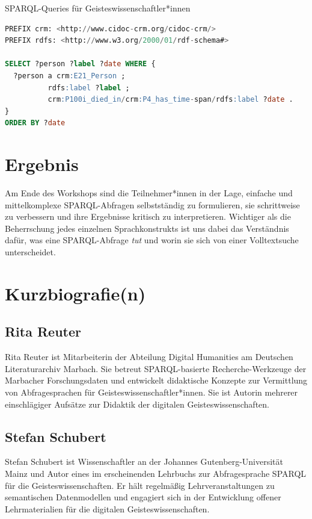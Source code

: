 \begin{beitrag}{SPARQL-Queries für Geisteswissenschaftler*innen}
\begin{lstlisting}[language=SQL, caption={Eine erste SPARQL-Abfrage als Einstieg.}]
PREFIX crm: <http://www.cidoc-crm.org/cidoc-crm/>
PREFIX rdfs: <http://www.w3.org/2000/01/rdf-schema#>

SELECT ?person ?label ?date WHERE {
  ?person a crm:E21_Person ;
          rdfs:label ?label ;
          crm:P100i_died_in/crm:P4_has_time-span/rdfs:label ?date .
}
ORDER BY ?date
\end{lstlisting}

\section{Ergebnis}
Am Ende des Workshops sind die Teilnehmer*innen in der Lage, einfache und mittelkomplexe SPARQL-Abfragen selbstständig zu formulieren, sie schrittweise zu verbessern und ihre Ergebnisse kritisch zu interpretieren. Wichtiger als die Beherrschung jedes einzelnen Sprachkonstrukts ist uns dabei das Verständnis dafür, was eine SPARQL-Abfrage \emph{tut} und worin sie sich von einer Volltextsuche unterscheidet.

\end{beitrag}

\section*{Kurzbiografie(n)}

\subsection*{Rita Reuter}
Rita Reuter ist Mitarbeiterin der Abteilung Digital Humanities am Deutschen Literaturarchiv Marbach. Sie betreut SPARQL-basierte Recherche-Werkzeuge der Marbacher Forschungsdaten und entwickelt didaktische Konzepte zur Vermittlung von Abfragesprachen für Geisteswissenschaftler*innen. Sie ist Autorin mehrerer einschlägiger Aufsätze zur Didaktik der digitalen Geisteswissenschaften.

\subsection*{Stefan Schubert}
Stefan Schubert ist Wissenschaftler an der Johannes Gutenberg-Universität Mainz und Autor eines im erscheinenden Lehrbuchs zur Abfragesprache SPARQL für die Geisteswissenschaften. Er hält regelmäßig Lehrveranstaltungen zu semantischen Datenmodellen und engagiert sich in der Entwicklung offener Lehrmaterialien für die digitalen Geisteswissenschaften.
